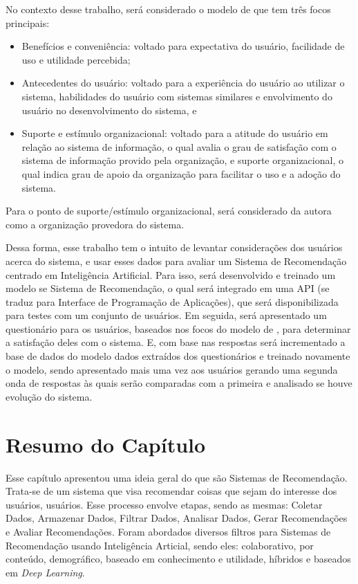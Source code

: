 No contexto desse trabalho, será considerado o modelo de  que tem três focos principais:
\begin{itemize}
    \item Benefícios e conveniência: voltado para expectativa do usuário, facilidade de uso e utilidade percebida;
    \item Antecedentes do usuário: voltado para a experiência do usuário ao utilizar o sistema, 
    habilidades do usuário com sistemas similares e envolvimento do 
    usuário no desenvolvimento do sistema, e
    \item Suporte e estímulo organizacional: voltado para a atitude do usuário em relação ao sistema de informação, o qual
    avalia o grau de satisfação com o sistema de informação provido pela organização,    
    e suporte organizacional, o qual indica grau de apoio da organização para facilitar o uso e a adoção do sistema.
\end{itemize}
Para o ponto de suporte/estímulo organizacional, será considerado da autora como a organização provedora do sistema.

Dessa forma, esse trabalho tem o intuito de levantar considerações dos usuários acerca do sistema, e usar esses
dados para avaliar um Sistema de Recomendação centrado em Inteligência Artificial. Para isso, será desenvolvido e treinado um
modelo se Sistema de Recomendação, o qual será integrado em uma API (se traduz para Interface de Programação de Aplicações), que
será disponibilizada para testes com um conjunto de usuários. Em seguida, será apresentado um questionário para os usuários,
baseados nos focos do modelo de , para determinar a satisfação deles com o sistema. E, 
com base nas respostas será incrementado a base de dados do modelo dados
extraídos dos questionários e treinado novamente o modelo, sendo apresentado mais uma vez aos usuários gerando uma segunda
onda de respostas às quais serão comparadas com a primeira e analisado se houve evolução do sistema.


\section{Resumo do Capítulo}\label{sec:resrefteor}

Esse capítulo apresentou uma ideia geral do que são Sistemas de Recomendação. Trata-se de um sistema que visa recomendar coisas que 
sejam do interesse dos usuários, usuários. Esse processo envolve etapas, sendo as mesmas: Coletar Dados, 
Armazenar Dados, Filtrar Dados, Analisar Dados, Gerar Recomendações e Avaliar Recomendações. 
Foram abordados diversos filtros para Sistemas de Recomendação usando Inteligência 
Articial, sendo eles: colaborativo, por conteúdo, demográfico, baseado em conhecimento e utilidade, híbridos e baseados em
\textit{Deep Learning}.

